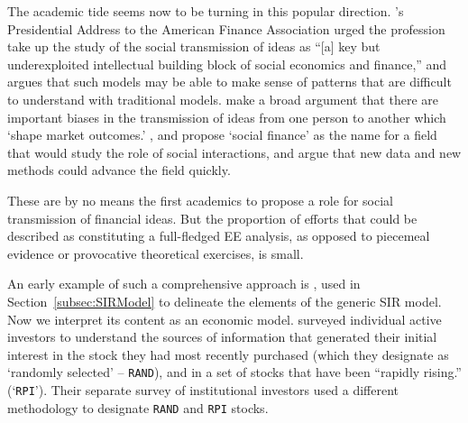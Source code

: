 
The academic tide seems now to be turning in this popular direction. \cite{hirshleifer2020presidential}'s Presidential Address to the American Finance Association urged the profession take up the study of the social transmission of ideas as ``[a] key but underexploited intellectual building block of social economics and finance,'' and argues that such models may be able to make sense of patterns that are difficult to understand with traditional models.  \cite{akccay2021social} make a broad argument that there are important biases in the transmission of ideas from one person to another which `shape market outcomes.' \cite{hirshleifer2015behavioral}, \cite{hirshleifer2020presidential} and \cite{kuchler2021social} propose `social finance' as the name for a field that would study the role of social interactions, and argue that new data and new methods could advance the field quickly.

These are by no means the first academics to propose a role for social transmission of financial ideas.  But the proportion of efforts that could be described as constituting a full-fledged EE analysis, as opposed to piecemeal evidence or provocative theoretical exercises, is small. %

An early example of such a comprehensive approach is  \cite{shiller1989survey}, used in Section~\ref{subsec:SIRModel} to delineate the elements of the generic SIR model.  Now we interpret its content as an economic model.  \cite{shiller1989survey} surveyed individual active investors to understand the sources of information that generated their initial interest in the stock they had most recently purchased (which they designate as `randomly selected' -- \texttt{RAND}), and in a set of stocks that have been ``rapidly rising.'' (`\texttt{RPI}').  Their separate survey of institutional investors used a different methodology to designate \texttt{RAND} and \texttt{RPI} stocks. %

